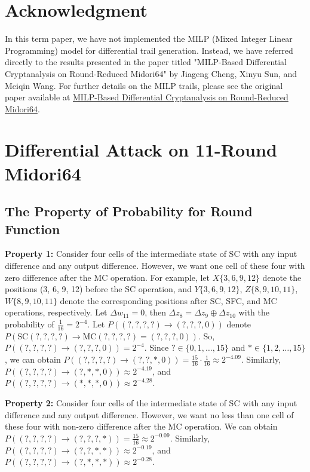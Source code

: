 \documentclass{article}
\begin{document}
\section*{Acknowledgment}
In this term paper, we have not implemented the MILP (Mixed Integer Linear Programming) model for differential trail generation. Instead, we have referred directly to the results presented in the paper titled "MILP-Based Differential Cryptanalysis on Round-Reduced Midori64" by Jiageng Cheng, Xinyu Sun, and Meiqin Wang. For further details on the MILP trails, please see the original paper available at \href{'../references/MILP-Based\_Differential\_Cryptanalysis\_on\_Round-Reducedi\_Midori64.pdf'}{MILP-Based Differential Cryptanalysis on Round-Reduced Midori64}.

\section{Differential Attack on 11-Round Midori64}

\subsection{The Property of Probability for Round Function}

\textbf{Property 1:} Consider four cells of the intermediate state of SC with any input difference and any output difference. However, we want one cell of these four with zero difference after the MC operation. For example, let $X\{3, 6, 9, 12\}$ denote the positions (3, 6, 9, 12) before the SC operation, and $Y\{3, 6, 9, 12\}$, $Z\{8, 9, 10, 11\}$, $W\{8, 9, 10, 11\}$ denote the corresponding positions after SC, SFC, and MC operations, respectively. Let $\Delta w_{11} = 0$, then $\Delta z_8 = \Delta z_9 \oplus \Delta z_{10}$ with the probability of $\frac{1}{16} = 2^{-4}$. Let $P((?, ?, ?, ?) \to (?, ?, ?, 0))$ denote $P(\text{SC}(?, ?, ?, ?) \to \text{MC}(?, ?, ?, ?) = (?, ?, ?, 0))$. So, $P((?, ?, ?, ?) \to (?, ?, ?, 0)) = 2^{-4}$. Since $? \in \{0, 1, \dots, 15\}$ and $\ast \in \{1, 2, \dots, 15\}$, we can obtain $P((?, ?, ?, ?) \to (?, ?, \ast, 0)) = \frac{15}{16} \cdot \frac{1}{16} \approx 2^{-4.09}$. Similarly, $P((?, ?, ?, ?) \to (?, \ast, \ast, 0)) \approx 2^{-4.19}$, and $P((?, ?, ?, ?) \to (\ast, \ast, \ast, 0)) \approx 2^{-4.28}$.

\textbf{Property 2:} Consider four cells of the intermediate state of SC with any input difference and any output difference. However, we want no less than one cell of these four with non-zero difference after the MC operation. We can obtain $P((?, ?, ?, ?) \to (?, ?, ?, \ast)) = \frac{15}{16} \approx 2^{-0.09}$. Similarly, $P((?, ?, ?, ?) \to (?, ?, \ast, \ast)) \approx 2^{-0.19}$, and $P((?, ?, ?, ?) \to (?, \ast, \ast, \ast)) \approx 2^{-0.28}$.
\end{document}
